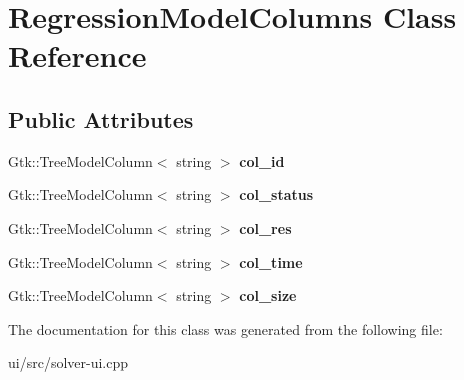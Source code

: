 \hypertarget{classRegressionModelColumns}{\section{\-Regression\-Model\-Columns \-Class \-Reference}
\label{classRegressionModelColumns}
}
\subsection*{\-Public \-Attributes}
\begin{DoxyCompactItemize}
\item 
\hypertarget{classRegressionModelColumns_a234da2cc7ccd81da07989976a170041b}{\-Gtk\-::\-Tree\-Model\-Column$<$ string $>$ {\bfseries col\-\_\-id}}\label{classRegressionModelColumns_a234da2cc7ccd81da07989976a170041b}

\item 
\hypertarget{classRegressionModelColumns_a2047c46be9766377c95bf9440da98bd9}{\-Gtk\-::\-Tree\-Model\-Column$<$ string $>$ {\bfseries col\-\_\-status}}\label{classRegressionModelColumns_a2047c46be9766377c95bf9440da98bd9}

\item 
\hypertarget{classRegressionModelColumns_afbe7653effc4c5a879ec6cbd659d615e}{\-Gtk\-::\-Tree\-Model\-Column$<$ string $>$ {\bfseries col\-\_\-res}}\label{classRegressionModelColumns_afbe7653effc4c5a879ec6cbd659d615e}

\item 
\hypertarget{classRegressionModelColumns_a9d455f88270a82789612e1be36a45317}{\-Gtk\-::\-Tree\-Model\-Column$<$ string $>$ {\bfseries col\-\_\-time}}\label{classRegressionModelColumns_a9d455f88270a82789612e1be36a45317}

\item 
\hypertarget{classRegressionModelColumns_aa7175ca9177af7d051db93a52ce7870d}{\-Gtk\-::\-Tree\-Model\-Column$<$ string $>$ {\bfseries col\-\_\-size}}\label{classRegressionModelColumns_aa7175ca9177af7d051db93a52ce7870d}

\end{DoxyCompactItemize}


\-The documentation for this class was generated from the following file\-:\begin{DoxyCompactItemize}
\item 
ui/src/solver-\/ui.\-cpp\end{DoxyCompactItemize}
